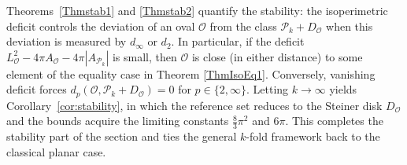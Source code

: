\documentclass{amsart}
\theoremstyle{definition}
\numberwithin{equation}{section}
\begin{document}
Theorems~\ref{Thmstab1} and \ref{Thmstab2} quantify the stability: the isoperimetric
deficit controls the deviation of an oval \(\mathcal O\) from the class
\(\mathcal P_k+D_{\mathcal{O}}\) when this deviation is measured by \(d_\infty\) or \(d_2\).
In particular, if the deficit $L_{\mathcal{O}}^2 - 4\pi A_{\mathcal{O}}-4\pi |A_{\mathcal{P}_k}|$ is small, then \(\mathcal O\) is close (in either
distance) to some element of the equality case in Theorem \ref{ThmIsoEq1}. Conversely, vanishing deficit
forces \(d_p(\mathcal O,\mathcal P_k+D_{\mathcal{O}})=0\) for \(p\in\{2,\infty\}\).
Letting \(k\to\infty\) yields Corollary~\ref{cor:stability}, in which the
reference set reduces to the Steiner disk \(D_{\mathcal{O}}\) and the bounds acquire the
limiting constants \(\tfrac{8}{3}\pi^2\) and \(6\pi\). This completes the
stability part of the section and ties the general \(k\)-fold framework back to
the classical planar case.
\end{document}
